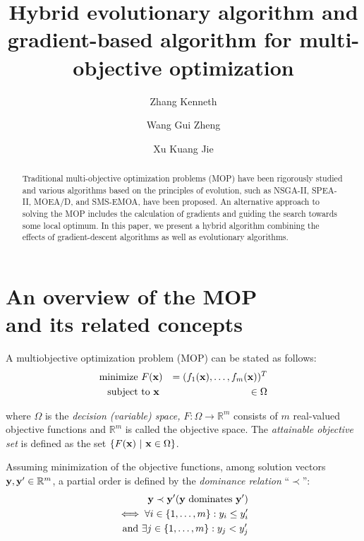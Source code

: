 \documentclass[%
 reprint,
 amsmath,amssymb,
 aps,
]{revtex4-2}
\newcommand{\bb}[1]
{\mathbb{#1}}
\begin{document}

\title{Hybrid evolutionary algorithm and gradient-based algorithm for multi-objective optimization}%

\author{%
Zhang Kenneth
}
\author{Wang Gui Zheng}%
\author{Xu Kuang Jie}
%


\begin{abstract}
Traditional multi-objective optimization problems (MOP) have been rigorously studied and various algorithms based on the principles of evolution, such as NSGA-II, SPEA-II, MOEA/D, and SMS-EMOA, have been proposed. An alternative approach to solving the MOP includes the calculation of gradients and guiding the search towards some local optimum. In this paper, we present a hybrid algorithm combining the effects of gradient-descent algorithms as well as evolutionary algorithms.
\end{abstract}

\maketitle


\section{\label{sec:level1}	
An overview of the MOP
\protect\\
and its related concepts}

A multiobjective optimization problem (MOP) can be stated as follows: \cite{MOEA-D}
\begin{eqnarray}
\text{minimize } F(\bold{x}) &&= (f_1(\bold{x}), \dots, f_m(\bold{x}))^T \nonumber\\
\text{subject to } \bold{x}\  &&\in \Omega
\end{eqnarray}

where $\Omega$ is the \textit{decision (variable) space, } $F : \Omega \to \bb{R}^m$ consists of $m$ real-valued objective functions and $\bb{R}^m$ is called the objective space. The \textit{attainable objective set} is defined as the set $\{F(\bold{x}) \ |\  \bold{x} \in \Omega\}$.

Assuming minimization of the objective functions, among solution vectors $\bold{y}, \bold{y}' \in \bb{R}^m$, a partial order is defined by the \textit{dominance relation} ``$\prec$'': \cite{SMS-EMOA}
\begin{eqnarray}
\bold{y} \prec \bold{y}' (\bold{y} \text{ dominates } \bold{y}') \nonumber\\
\iff
\forall i \in \{1, \dots, m\}: y_i \leq y_i' \nonumber\\
\text{and } \exists j \in \{1, \dots, m\} : y_j < y_j'
\end{eqnarray}
\end{document}
